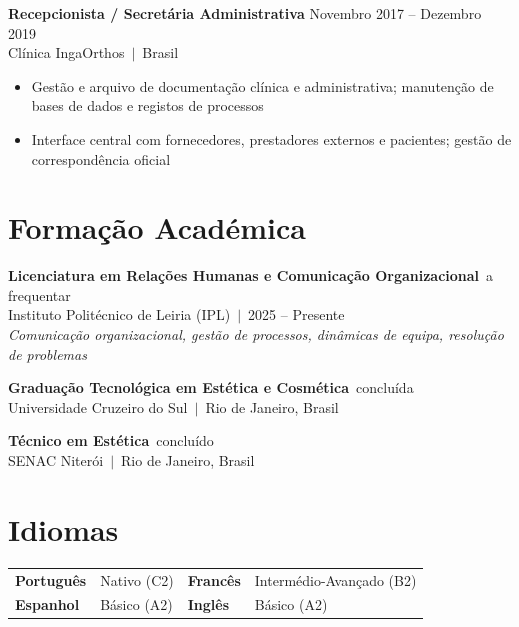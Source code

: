 \documentclass[10pt,a4paper]{article}
\begin{document}
\vspace{4pt}
{\small\bfseries Recepcionista / Secretária Administrativa}\hfill{\small\color{subtle} Novembro 2017 -- Dezembro 2019}\\
{\small\color{accent} Clínica IngaOrthos~$|$~Brasil}
\begin{itemize}\small
  \item Gestão e arquivo de documentação clínica e administrativa; manutenção de bases de dados e registos de processos
  \item Interface central com fornecedores, prestadores externos e pacientes; gestão de correspondência oficial
\end{itemize}

\section{Formação Académica}

{\small\bfseries Licenciatura em Relações Humanas e Comunicação Organizacional}~\hfill{\small\color{subtle}a frequentar}\\
{\small Instituto Politécnico de Leiria (IPL)~$|$~2025 -- Presente}\\
{\small\color{subtle}\textit{Comunicação organizacional, gestão de processos, dinâmicas de equipa, resolução de problemas}}

\vspace{3pt}
{\small\bfseries Graduação Tecnológica em Estética e Cosmética}~\hfill{\small\color{subtle}concluída}\\
{\small Universidade Cruzeiro do Sul~$|$~Rio de Janeiro, Brasil}

\vspace{3pt}
{\small\bfseries Técnico em Estética}~\hfill{\small\color{subtle}concluído}\\
{\small SENAC Niterói~$|$~Rio de Janeiro, Brasil}

\section{Idiomas}

\begin{tabularx}{\textwidth}{llll}
  \small\textbf{Português} & \small Nativo (C2) &
  \small\textbf{Francês} & \small Intermédio-Avançado (B2) \\[2pt]
  \small\textbf{Espanhol} & \small Básico (A2) &
  \small\textbf{Inglês} & \small Básico (A2) \\
\end{tabularx}
\end{document}
